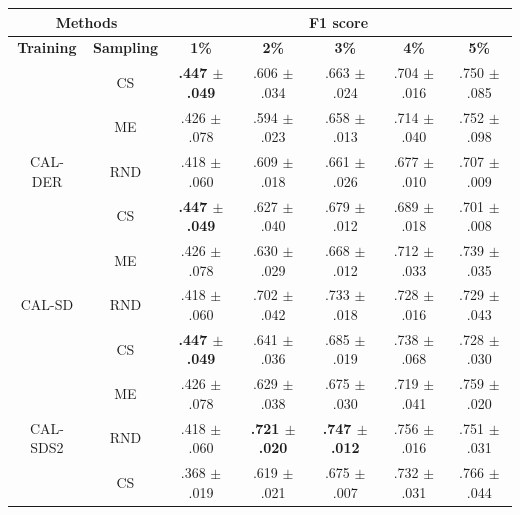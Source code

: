 \begin{table}[htbp]
\centering

\begin{tabular*}{\linewidth}{c|c|@{\extracolsep{\fill}}ccccc}
\toprule
\multicolumn{2}{c|}{\textbf{Methods}} & \multicolumn{5}{c}{\textbf{F1 score}} \\
\midrule
\textbf{Training} & \textbf{Sampling} & \textbf{1\%} & \textbf{2\%} & \textbf{3\%} & \textbf{4\%} & \textbf{5\%}\\
\midrule
 & CS & \textbf{.447 $\pm$ {\small .049}} & .606 $\pm$ {\small .034} & .663 $\pm$ {\small .024} & .704 $\pm$ {\small .016} & .750 $\pm$ {\small .085}\\

 & ME & .426 $\pm$ {\small .078} & .594 $\pm$ {\small .023} & .658 $\pm$ {\small .013} & .714 $\pm$ {\small .040} & .752 $\pm$ {\small .098}\\

\multirow{-3}{*}{\raggedright\arraybackslash CAL-DER} & RND & .418 $\pm$ {\small .060} & .609 $\pm$ {\small .018} & .661 $\pm$ {\small .026} & .677 $\pm$ {\small .010} & .707 $\pm$ {\small .009}\\
\midrule
 & CS & \textbf{.447 $\pm$ {\small .049}} & .627 $\pm$ {\small .040} & .679 $\pm$ {\small .012} & .689 $\pm$ {\small .018} & .701 $\pm$ {\small .008}\\

 & ME & .426 $\pm$ {\small .078} & .630 $\pm$ {\small .029} & .668 $\pm$ {\small .012} & .712 $\pm$ {\small .033} & .739 $\pm$ {\small .035}\\

\multirow{-3}{*}{\raggedright\arraybackslash CAL-SD} & RND & .418 $\pm$ {\small .060} & .702 $\pm$ {\small .042} & .733 $\pm$ {\small .018} & .728 $\pm$ {\small .016} & .729 $\pm$ {\small .043}\\
\midrule
 & CS & \textbf{.447 $\pm$ {\small .049}} & .641 $\pm$ {\small .036} & .685 $\pm$ {\small .019} & .738 $\pm$ {\small .068} & .728 $\pm$ {\small .030}\\

 & ME & .426 $\pm$ {\small .078} & .629 $\pm$ {\small .038} & .675 $\pm$ {\small .030} & .719 $\pm$ {\small .041} & .759 $\pm$ {\small .020}\\

\multirow{-3}{*}{\raggedright\arraybackslash CAL-SDS2} & RND & .418 $\pm$ {\small .060} & \textbf{.721 $\pm$ {\small .020}} & \textbf{.747 $\pm$ {\small .012}} & .756 $\pm$ {\small .016} & .751 $\pm$ {\small .031}\\
\midrule
 & CS & .368 $\pm$ {\small .019} & .619 $\pm$ {\small .021} & .675 $\pm$ {\small .007} & .732 $\pm$ {\small .031} & .766 $\pm$ {\small .044}\\


\end{tabular*}
\end{table}
